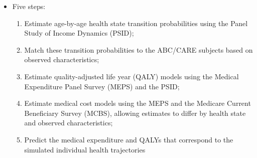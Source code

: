 \documentclass[static]{JJH-Beamer}
\begin{document}
\begin{frame}

\begin{itemize}
\item Five steps:
    \begin{enumerate}[(1)]
    \item Estimate age-by-age health state transition probabilities using the Panel Study of Income Dynamics (PSID);
    \item Match these transition probabilities to the ABC/CARE subjects based on observed characteristics;
    \item Estimate quality-adjusted life year (QALY) models using the Medical Expenditure Panel Survey (MEPS) and the PSID;
    \item Estimate medical cost models using the MEPS and the Medicare Current Beneficiary Survey (MCBS), allowing estimates to differ by health state and observed characteristics;
    \item Predict the medical expenditure and QALYs that correspond to the simulated individual health trajectories
    \end{enumerate}
\end{itemize}

\end{frame}
\end{document}
